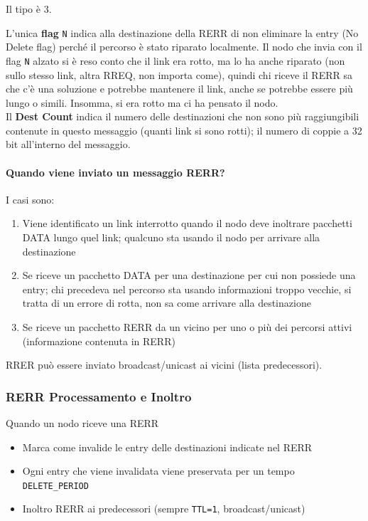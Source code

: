 Il tipo è 3. 

L'unica \textbf{flag} \texttt{N} indica alla destinazione della RERR di non eliminare la entry (No Delete flag) perché il percorso è stato riparato localmente. Il nodo che invia con il flag \texttt{N} alzato si è reso conto che il link era rotto, ma lo ha anche riparato (non sullo stesso link, altra RREQ, non importa come), quindi chi riceve il RERR sa che c'è una soluzione e potrebbe mantenere il link, anche se potrebbe essere più lungo o simili. Insomma, si era rotto ma ci ha pensato il nodo.\\

Il \textbf{Dest Count} indica il numero delle destinazioni che non sono più raggiungibili contenute in questo messaggio (quanti link si sono rotti); il numero di coppie a 32 bit all'interno del messaggio.\\


\paragraph{Quando viene inviato un messaggio RERR?} I casi sono:
\begin{enumerate}
	\item Viene identificato un link interrotto quando il nodo deve inoltrare pacchetti DATA lungo quel link; qualcuno sta usando il nodo per arrivare alla destinazione
	\item Se riceve un pacchetto DATA per una destinazione per cui non possiede una entry; chi precedeva nel percorso sta usando informazioni troppo vecchie, si tratta di un errore di rotta, non sa come arrivare alla destinazione
	\item Se riceve un pacchetto RERR da un vicino per uno o più dei percorsi attivi (informazione contenuta in RERR)
\end{enumerate}

RRER può essere inviato broadcast/unicast ai vicini (lista predecessori).\\

\subsubsection{RERR Processamento e Inoltro}

Quando un nodo riceve una RERR
\begin{itemize}
	\item Marca come invalide le entry delle destinazioni indicate nel RERR
	\item Ogni entry che viene invalidata viene preservata per un tempo \texttt{DELETE\_PERIOD}
	\item Inoltro RERR ai predecessori (sempre \texttt{TTL=1}, broadcast/unicast)
\end{itemize}

